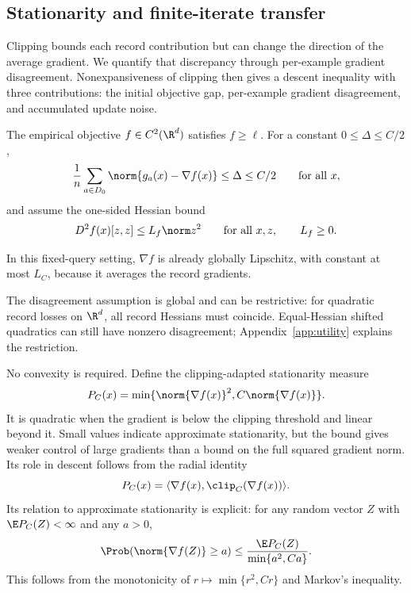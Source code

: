 \subsection{Stationarity and finite-iterate transfer}

Clipping bounds each record contribution but can change the direction of
the average gradient. We quantify that discrepancy through per-example gradient
disagreement. Nonexpansiveness of clipping then gives a descent inequality
with three contributions: the initial objective gap, per-example gradient disagreement,
and accumulated update noise.

\begin{assumption}\label{ass:objective}
The empirical objective $f\in C^2(\R^d)$ satisfies $f\geq\ell$.
For a constant $0\leq\Delta\leq C/2$,
\begin{equation}\label{eq:dispersion}
 \frac1{n}\sum_{a\in D_0}\norm{g_a(x)-\nabla f(x)}
 \leq\Delta\leq C/2\qquad\text{for all }x,
\end{equation}
and assume the one-sided Hessian bound
\begin{equation}\label{eq:hessian}
 D^2f(x)[z,z]\leq L_f\norm z^2
 \qquad\text{for all }x,z,\qquad L_f\geq0.
\end{equation}
\end{assumption}
In this fixed-query setting, $\nabla f$ is already globally Lipschitz,
with constant at most $L_C$, because it averages the record gradients.

The disagreement assumption is global and can be restrictive: for quadratic
record losses on $\R^d$, all record Hessians must coincide. Equal-Hessian
shifted quadratics can still have nonzero disagreement; Appendix~\ref{app:utility}
explains the restriction.

No convexity is required. Define the clipping-adapted stationarity measure
\begin{equation}\label{eq:penalty}
 P_C(x)=\min\{\norm{\nabla f(x)}^2,C\norm{\nabla f(x)}\}.
\end{equation}
It is quadratic when the gradient is below the clipping threshold and
linear beyond it. Small values indicate approximate stationarity, but the
bound gives weaker control of large gradients than a bound on the full
squared gradient norm. Its role in descent follows from the radial identity
\[
 P_C(x)=\langle\nabla f(x),\clip_C(\nabla f(x))\rangle.
\]
Its relation to approximate stationarity is explicit: for any random
vector $Z$ with $\E P_C(Z)<\infty$ and any $a>0$,
\begin{equation}\label{eq:stationarity-probability}
 \Prob(\norm{\nabla f(Z)}\geq a)
 \leq\frac{\E P_C(Z)}{\min\{a^2,Ca\}}.
\end{equation}
This follows from the monotonicity of $r\mapsto\min\{r^2,Cr\}$ and
Markov's inequality.

